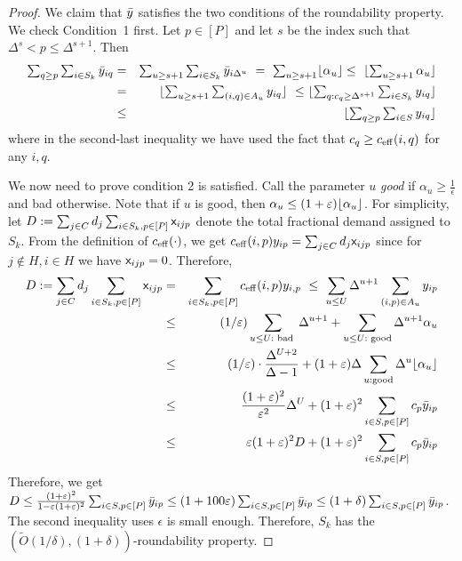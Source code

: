 \begin{proof}
We claim that $\bar{y}$ satisfies the two conditions of the roundability property. We check Condition~1 first. Let $p \in [P]$ and let $s$ be the index such that $\Delta^s < p \leq \Delta^{s+1}$. Then
\begin{eqnarray}
\textstyle \sum_{q \geq p} \sum_{i \in S_k} \y_{iq} & = & \textstyle \sum_{u \geq s+1} \sum_{i \in S_k} \y_{i\Delta^u} \ = \ \sum_{u \geq s+1} \floor{\alpha_u} \leq \textstyle \ \floor{\sum_{u \geq s+1} \alpha_u } \\
& = &  \textstyle \floor{\sum_{u \geq s+1} \sum_{(i,q) \in A_u} y_{iq}} \ \leq \floor{\sum_{q: c_q \geq \Delta^{s+1}} \sum_{i \in S_k} y_{iq} } \\
& \leq &  \textstyle\floor{\sum_{q \geq p}\sum_{i\in S} y_{iq}}
\end{eqnarray}
where in the second-last inequality  we have used the fact that $c_q \geq c_{\mathrm{eff}}(i,q)$ for any $i,q$.\smallskip
%

We now need to prove condition 2 is satisfied.
Call the parameter $u$ {\em good} if $\alpha_u \geq \frac{1}{\epsilon}$ and bad otherwise.
Note that if $u$ is good, then $\alpha_u \leq (1+\varepsilon)\lfloor\alpha_u\rfloor$.
For simplicity, let
$
D:= \sum_{j\in C} d_j \sum_{i\in S_k,p\in [P]} {\mathsf x}_{ijp}
$ denote the total fractional demand assigned to $S_k$. %
From the definition of $c_{\mathrm{eff}}(\cdot)$, we get $c_{\mathrm{eff}}(i,p)y_{ip} = \sum_{j\in C} d_j {\mathsf x}_{ijp}$ since for $j\notin H,i\in H$ we have ${\mathsf x}_{ijp} = 0$. Therefore,
\begin{eqnarray}
D := \sum_{j\in C} d_j \sum_{i\in S_k,p\in [P]} {\mathsf x}_{ijp} & = &  \sum_{i\in S_k,p\in [P]} c_{\mathrm{eff}}(i,p)y_{i,p}	\  \leq \ \sum_{u\leq U} \Delta^{u+1} \sum_{(i,p)\in A_u} y_{ip} \\
	& \leq & (1/\varepsilon)\sum_{u\le U: \textrm{ bad }} \Delta^{u+1} + \sum_{u\le U: \textrm{ good}} \Delta^{u+1} \alpha_u\\
	&	  \leq & \  (1/\varepsilon) \cdot \frac{\Delta^{U+2}}{\Delta - 1} + (1+\varepsilon)\Delta \sum_{u: \textrm{good}}\Delta^{u} \lfloor\alpha_u\rfloor  \\
																				& \leq & \frac{(1+\varepsilon)^2}{\varepsilon^2}\Delta^U + (1+\varepsilon)^2 \sum_{i\in S,p\in [P]}c_p\bar{y}_{ip} \\
																				& \leq & \varepsilon(1+\varepsilon)^2 D + (1+\varepsilon)^2 \sum_{i\in S,p\in [P]}c_p\bar{y}_{ip}
\end{eqnarray}
Therefore, we get $D \leq \frac{(1+\varepsilon)^2}{1 - \varepsilon(1+\varepsilon)^2}\sum_{i\in S,p\in [P]} \bar{y}_{ip} \leq (1+100\varepsilon)\sum_{i\in S,p\in [P]} \bar{y}_{ip} \leq (1+\delta)\sum_{i\in S,p\in [P]} \bar{y}_{ip}$.
The second inequality uses $\epsilon$ is small enough.
Therefore, $S_k$ has the $\left(\tilde{O}(1/\delta),(1+\delta)\right)$-roundability property.
\end{proof}
